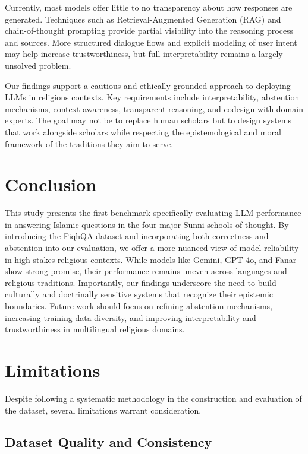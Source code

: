 \documentclass[letterpaper]{article}
\begin{document}
Currently, most models offer little to no transparency about how responses are generated. Techniques such as Retrieval-Augmented Generation (RAG) and chain-of-thought prompting provide partial visibility into the reasoning process and sources. More structured dialogue flows and explicit modeling of user intent may help increase trustworthiness, but full interpretability remains a largely unsolved problem.

Our findings support a cautious and ethically grounded approach to deploying LLMs in religious contexts. Key requirements include interpretability, abstention mechanisms, context awareness, transparent reasoning, and codesign with domain experts. The goal may not be to replace human scholars but to design systems that work alongside scholars while respecting the epistemological and moral framework of the traditions they aim to serve.

\section{Conclusion}
This study presents the first benchmark specifically evaluating LLM performance in answering Islamic questions in the four major Sunni schools of thought. By introducing the FiqhQA dataset and incorporating both correctness and abstention into our evaluation, we offer a more nuanced view of model reliability in high-stakes religious contexts. While models like Gemini, GPT-4o, and Fanar show strong promise, their performance remains uneven across languages and religious traditions. Importantly, our findings underscore the need to build culturally and doctrinally sensitive systems that recognize their epistemic boundaries. Future work should focus on refining abstention mechanisms, increasing training data diversity, and improving interpretability and trustworthiness in multilingual religious domains.


\section{Limitations}

Despite following a systematic methodology in the construction and evaluation of the dataset, several limitations warrant consideration.

\subsection{Dataset Quality and Consistency}
\end{document}
